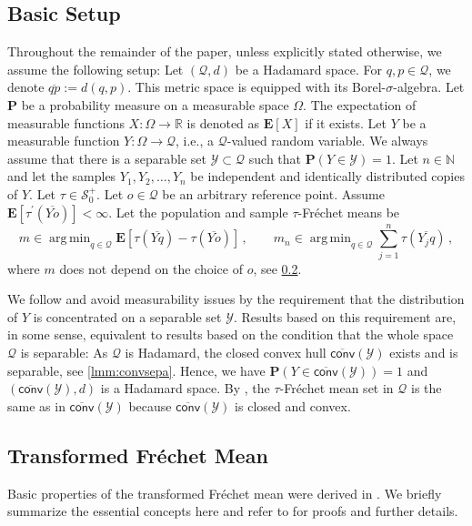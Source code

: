 \documentclass{article}
\newcommand*{\mc}[1]{\mathcal{#1}}
\newcommand*{\ms}[1]{\mathsf{#1}}
\newcommand{\N}{\mathbb{N}}
\newcommand{\R}{\mathbb{R}}
\newcommand{\lab}{\left[} %
\newcommand{\rab}{\right]} %
\newcommand{\ab}[1]{\lab #1 \rab} %
\newcommand{\abOf}[1]{\!\ab{#1}} %
\renewcommand{\Pr}{\mathbf{P}} %
\newcommand{\Prof}[1]{\Pr(#1)}
\newcommand{\E}{\mathbf{E}} %
\newcommand{\Eof}[1]{\E[#1]}
\newcommand{\EOf}[1]{\E\abOf{#1}}
\newcommand{\pr}{^\prime}
\newcommand{\eqcm}{\,,} %
\DeclareMathOperator*{\argmin}{arg\,min}
\newcommand{\ol}[2]{\overline{#1#2}}
\newcommand{\tran}{\tau}
\newcommand{\dtran}{\tau\pr}
\newcommand{\setcciz}{\mc S_0^+}
\begin{document}
\subsection{Basic Setup}\label{ssec:prelim:setup}
%
Throughout the remainder of the paper, unless explicitly stated otherwise, we assume the following setup: Let $(\mc Q, d)$ be a Hadamard space. For $q,p\in\mc Q$, we denote $\ol{q}{p} := d(q, p)$. This metric space is equipped with its Borel-$\sigma$-algebra. Let $\Pr$ be a probability measure on a measurable space $\Omega$. The expectation of measurable functions $X \colon \Omega \to \R$ is denoted as $\Eof{X}$ if it exists. Let $Y$ be a measurable function $Y \colon \Omega \to \mc Q$, i.e., a $\mc Q$-valued random variable. We always assume that there is a separable set $\mc Y \subset \mc Q$ such that $\Prof{Y\in \mc Y} = 1$. Let $n\in\N$ and let the samples $Y_1, Y_2, \dots, Y_n$ be independent and identically distributed copies of $Y$.
Let $\tran \in \setcciz$. Let $o\in\mc Q$ be an arbitrary reference point. Assume $\Eof{\dtran(\ol Yo)} < \infty$. Let the population and sample $\tran$-Fr\'echet means be
\begin{equation}
	m \in \argmin_{q\in\mc Q} \EOf{\tran(\ol {Y}q)-\tran(\ol {Y}o)}\eqcm\qquad
	m_n \in \argmin_{q\in\mc Q} \sum_{j=1}^n \tran(\ol {Y_j}q)
	\eqcm
\end{equation}
where $m$ does not depend on the choice of $o$, see \cref{ssec:tfm}.
%
\begin{remark}
    We follow \cite[beginning of Section 4]{sturm03} and avoid measurability issues by the requirement that the distribution of $Y$ is concentrated on a separable set $\mc Y$.
    Results based on this requirement are, in some sense, equivalent to results based on the condition that the whole space $\mc Q$ is separable:
    As $\mc Q$ is Hadamard, the closed convex hull $\overline{\ms{conv}}(\mc Y)$ exists and is separable, see \cref{lmm:convsepa}.
    Hence, we have $\Prof{Y\in \overline{\ms{conv}}(\mc Y)} = 1$ and $(\overline{\ms{conv}}(\mc Y), d)$ is a Hadamard space.
    By \cite[Proposition 5.2]{varinequ}, the $\tran$-Fr\'echet mean set in $\mc Q$ is the same as in $\overline{\ms{conv}}(\mc Y)$ because $\overline{\ms{conv}}(\mc Y)$ is closed and convex.
\end{remark}
%
%
%
\subsection{Transformed Fr\'echet Mean}\label{ssec:tfm}
%
Basic properties of the transformed Fr\'echet mean were derived in \cite{varinequ}. We briefly summarize the essential concepts here and refer to \cite{varinequ} for proofs and further details.
\end{document}
